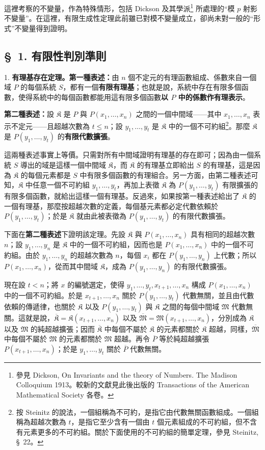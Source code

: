 \documentclass[11pt]{article}
\newcommand{\srcemph}[1]{\textbf{#1}}
\begin{document}
這裡考察的不變量，作為特殊情形，包括 Dickson 及其學派\footnote{參見 Dickson, On Invariants and the theory of Numbers. The Madison Colloquium 1913。較新的文獻見此後出版的 Transactions of the American Mathematical Society 各卷。} 所處理的“模 $p$ 射影不變量”。在這裡，有限生成性定理此前雖已對模不變量成立，卻尚未對一般的“形式”不變量得到證明。

\subsection*{\S\ 1. 有限性判別準則}

1. \srcemph{有理基存在定理。第一種表述：}由 $n$ 個不定元的有理函數組成、係數來自一個域 $P$ 的每個系統 $S$，都有一個\srcemph{有限有理基}；也就是說，系統中存在有限多個函數，使得系統中的每個函數都能用這有限多個函數\srcemph{以 $P$ 中的係數作有理表示}。

\srcemph{第二種表述：}設 $\mathfrak K$ 是 $P$ 與 $P(x_1,\ldots,x_n)$ 之間的一個中間域——其中 $x_1,\ldots,x_n$ 表示不定元——且超越次數為 $t\leq n$；設 $y_1,\ldots,y_t$ 是 $\mathfrak K$ 中的一個不可約組\footnote{按 Steinitz 的說法，一個組稱為不可約，是指它由代數無關函數組成。一個組稱為超越次數為 $t$，是指它至少含有一個由 $t$ 個元素組成的不可約組，但不含有元素更多的不可約組。關於下面使用的不可約組的簡單定理，參見 Steinitz, \S\ 22。}。那麼 $\mathfrak K$ 是 $P(y_1,\ldots,y_t)$ 的\srcemph{有限代數擴張}。

這兩種表述事實上等價。只需對所有中間域證明有理基的存在即可；因為由一個系統 $S$ 導出的域是這樣一個中間域 $\mathfrak K$，而 $\mathfrak K$ 的有理基立即給出 $S$ 的有理基，這是因為 $\mathfrak K$ 的每個元素都是 $S$ 中有限多個函數的有理組合。另一方面，由第二種表述可知，$\mathfrak K$ 中任意一個不可約組 $y_1,\ldots,y_t$，再加上表徵 $\mathfrak K$ 為 $P(y_1,\ldots,y_t)$ 有限擴張的有限多個函數，就給出這樣一個有理基。反過來，如果按第一種表述給出了 $\mathfrak K$ 的一個有理基，那麼按超越次數的定義，每個基元素都必定代數依賴於 $P(y_1,\ldots,y_t)$；於是 $\mathfrak K$ 就由此被表徵為 $P(y_1,\ldots,y_t)$ 的有限代數擴張。

下面在\srcemph{第二種表述}下證明該定理。先設 $\mathfrak K$ 與 $P(x_1,\ldots,x_n)$ 具有相同的超越次數 $n$；設 $y_1,\ldots,y_n$ 是 $\mathfrak K$ 中的一個不可約組，因而也是 $P(x_1,\ldots,x_n)$ 中的一個不可約組。由於 $y_1,\ldots,y_n$ 的超越次數為 $n$，每個 $x_i$ 都在 $P(y_1,\ldots,y_n)$ 上代數；所以 $P(x_1,\ldots,x_n)$，從而其中間域 $\mathfrak K$，成為 $P(y_1,\ldots,y_n)$ 的有限代數擴張。

現在設 $t<n$；將 $x$ 的編號選定，使得 $y_1,\ldots,y_t,x_{t+1},\ldots,x_n$ 構成 $P(x_1,\ldots,x_n)$ 中的一個不可約組。於是 $x_{t+1},\ldots,x_n$ 關於 $P(y_1,\ldots,y_t)$ 代數無關，並且由代數依賴的傳遞律，也關於 $\mathfrak K$ 以及 $P(y_1,\ldots,y_t)$ 與 $\mathfrak K$ 之間的每個中間域 $\mathfrak M$ 代數無關。這就是說，$\overline{\mathfrak K}=\mathfrak K(x_{t+1},\ldots,x_n)$ 以及 $\overline{\mathfrak M}=\mathfrak M(x_{t+1},\ldots,x_n)$，分別成為 $\mathfrak K$ 以及 $\mathfrak M$ 的純超越擴張；因而 $\overline{\mathfrak K}$ 中每個不屬於 $\mathfrak K$ 的元素都關於 $\mathfrak K$ 超越，同樣，$\overline{\mathfrak M}$ 中每個不屬於 $\mathfrak M$ 的元素都關於 $\mathfrak M$ 超越。再令 $\overline P$ 等於純超越擴張 $P(x_{t+1},\ldots,x_n)$；於是 $y_1,\ldots,y_t$ 關於 $\overline P$ 代數無關。
\end{document}
